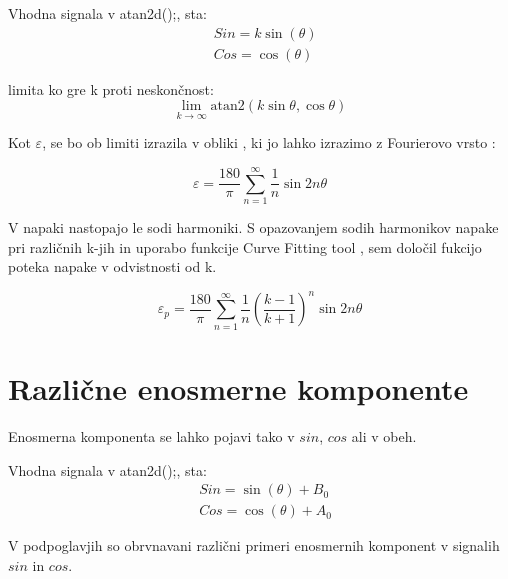 Vhodna signala v atan2d();, sta:
\begin{eqnarray}
\label{equ:def_sin_ama}
&Sin = k \sin(\theta)\\
\label{equ:def_cos_amp}
&Cos =\cos(\theta)
\end{eqnarray}

limita ko gre k proti neskončnost:
\begin{equation}
\lim_{k \rightarrow \infty} \mathrm{atan2}(k \sin{\theta},\cos{\theta})
\end{equation}


Kot $\varepsilon$, se bo ob limiti  izrazila v obliki , ki jo lahko izrazimo z Fourierovo vrsto \cite{fourierova_vrsta}:

\begin{equation}
\varepsilon = \frac{180}{\pi}\sum_{n=1}^{\infty}\frac{1}{n} \sin 2 n \theta
\end{equation}

V napaki nastopajo le sodi harmoniki. S opazovanjem sodih harmonikov napake pri različnih k-jih in uporabo funkcije Curve Fitting tool \cite{cftool}, sem določil fukcijo poteka napake v odvistnosti od k. 

\begin{equation}
\label{vrsta_k}
\varepsilon_p =\frac{180}{\pi}\sum_{n=1}^{\infty}\frac{1}{n}(\frac{k-1}{k+1})^n \sin 2 n \theta
\end{equation}



\newpage


\section{Različne enosmerne komponente}

Enosmerna komponenta se lahko pojavi tako v $sin$, $cos$ ali v obeh.

Vhodna signala v atan2d();, sta:
\begin{eqnarray}
\label{equ:def_sin_ama}
&Sin = \sin(\theta) + B_0\\
\label{equ:def_cos_amp}
&Cos =\cos(\theta) +A_0
\end{eqnarray}

V podpoglavjih so obrvnavani različni primeri enosmernih komponent v signalih $sin$ in $cos$.
